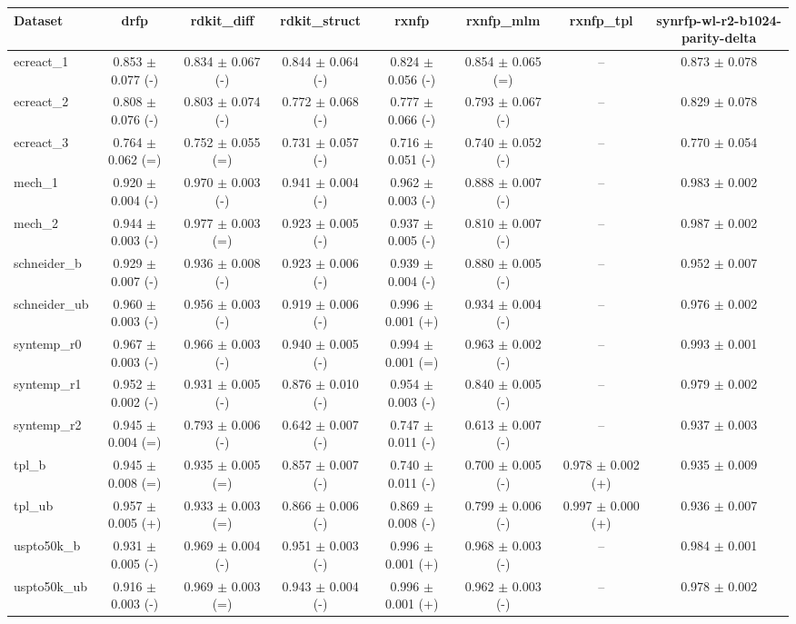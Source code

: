\begin{tabular}{lccccccc}
\toprule
Dataset & drfp & rdkit\_diff & rdkit\_struct & rxnfp & rxnfp\_mlm & rxnfp\_tpl & synrfp-wl-r2-b1024-parity-delta \\
\midrule
ecreact\_1 & 0.853 $\pm$ 0.077 (-) & 0.834 $\pm$ 0.067 (-) & 0.844 $\pm$ 0.064 (-) & 0.824 $\pm$ 0.056 (-) & 0.854 $\pm$ 0.065 (=) & -- & 0.873 $\pm$ 0.078 \\
ecreact\_2 & 0.808 $\pm$ 0.076 (-) & 0.803 $\pm$ 0.074 (-) & 0.772 $\pm$ 0.068 (-) & 0.777 $\pm$ 0.066 (-) & 0.793 $\pm$ 0.067 (-) & -- & 0.829 $\pm$ 0.078 \\
ecreact\_3 & 0.764 $\pm$ 0.062 (=) & 0.752 $\pm$ 0.055 (=) & 0.731 $\pm$ 0.057 (-) & 0.716 $\pm$ 0.051 (-) & 0.740 $\pm$ 0.052 (-) & -- & 0.770 $\pm$ 0.054 \\
mech\_1 & 0.920 $\pm$ 0.004 (-) & 0.970 $\pm$ 0.003 (-) & 0.941 $\pm$ 0.004 (-) & 0.962 $\pm$ 0.003 (-) & 0.888 $\pm$ 0.007 (-) & -- & 0.983 $\pm$ 0.002 \\
mech\_2 & 0.944 $\pm$ 0.003 (-) & 0.977 $\pm$ 0.003 (=) & 0.923 $\pm$ 0.005 (-) & 0.937 $\pm$ 0.005 (-) & 0.810 $\pm$ 0.007 (-) & -- & 0.987 $\pm$ 0.002 \\
schneider\_b & 0.929 $\pm$ 0.007 (-) & 0.936 $\pm$ 0.008 (-) & 0.923 $\pm$ 0.006 (-) & 0.939 $\pm$ 0.004 (-) & 0.880 $\pm$ 0.005 (-) & -- & 0.952 $\pm$ 0.007 \\
schneider\_ub & 0.960 $\pm$ 0.003 (-) & 0.956 $\pm$ 0.003 (-) & 0.919 $\pm$ 0.006 (-) & 0.996 $\pm$ 0.001 (+) & 0.934 $\pm$ 0.004 (-) & -- & 0.976 $\pm$ 0.002 \\
syntemp\_r0 & 0.967 $\pm$ 0.003 (-) & 0.966 $\pm$ 0.003 (-) & 0.940 $\pm$ 0.005 (-) & 0.994 $\pm$ 0.001 (=) & 0.963 $\pm$ 0.002 (-) & -- & 0.993 $\pm$ 0.001 \\
syntemp\_r1 & 0.952 $\pm$ 0.002 (-) & 0.931 $\pm$ 0.005 (-) & 0.876 $\pm$ 0.010 (-) & 0.954 $\pm$ 0.003 (-) & 0.840 $\pm$ 0.005 (-) & -- & 0.979 $\pm$ 0.002 \\
syntemp\_r2 & 0.945 $\pm$ 0.004 (=) & 0.793 $\pm$ 0.006 (-) & 0.642 $\pm$ 0.007 (-) & 0.747 $\pm$ 0.011 (-) & 0.613 $\pm$ 0.007 (-) & -- & 0.937 $\pm$ 0.003 \\
tpl\_b & 0.945 $\pm$ 0.008 (=) & 0.935 $\pm$ 0.005 (=) & 0.857 $\pm$ 0.007 (-) & 0.740 $\pm$ 0.011 (-) & 0.700 $\pm$ 0.005 (-) & 0.978 $\pm$ 0.002 (+) & 0.935 $\pm$ 0.009 \\
tpl\_ub & 0.957 $\pm$ 0.005 (+) & 0.933 $\pm$ 0.003 (=) & 0.866 $\pm$ 0.006 (-) & 0.869 $\pm$ 0.008 (-) & 0.799 $\pm$ 0.006 (-) & 0.997 $\pm$ 0.000 (+) & 0.936 $\pm$ 0.007 \\
uspto50k\_b & 0.931 $\pm$ 0.005 (-) & 0.969 $\pm$ 0.004 (-) & 0.951 $\pm$ 0.003 (-) & 0.996 $\pm$ 0.001 (+) & 0.968 $\pm$ 0.003 (-) & -- & 0.984 $\pm$ 0.001 \\
uspto50k\_ub & 0.916 $\pm$ 0.003 (-) & 0.969 $\pm$ 0.003 (=) & 0.943 $\pm$ 0.004 (-) & 0.996 $\pm$ 0.001 (+) & 0.962 $\pm$ 0.003 (-) & -- & 0.978 $\pm$ 0.002 \\
\bottomrule
\end{tabular}
